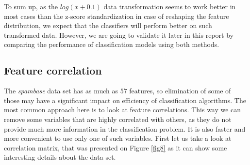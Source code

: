 \documentclass{article}\usepackage[]{graphicx}\usepackage[]{xcolor}
\begin{document}
To sum up, as the $log(x+0.1)$ data transformation seems to work better in most cases 
than the z-score standardization in case of reshaping the feature distribution, 
we expect that the classifiers will perform better on such transformed data. 
However, we are going to validate it later in this report by comparing the performance
of classification models using both methods.

\clearpage

\subsection*{Feature correlation}

The \textit{spambase} data set has as much as $57$ features, so elimination of some of those may 
have a significant impact on efficiency of classification algorithms. 
The most common approach here is to look at feature correlations. This way we can 
remove some variables that are highly correlated with others, as they do not provide 
much more information in the classification problem. It is also faster and more 
convenient to use only one of such variables. First let us take a look at correlation matrix, 
that was presented on Figure \ref{fig8} as it can show some interesting details about the data set.
\end{document}
